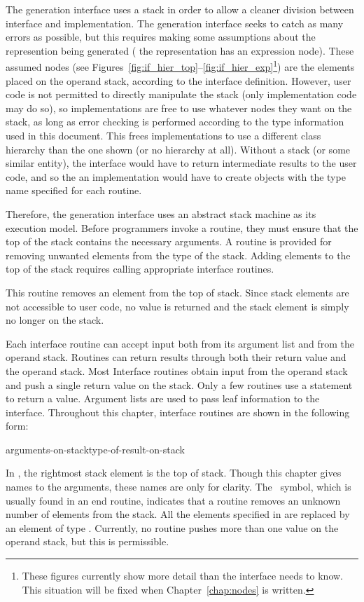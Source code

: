 The generation interface uses a stack in order to allow a cleaner
division between interface and implementation.  The generation
interface seeks to catch as many errors as possible, but this requires
making some assumptions about the represention being generated (\eg
the representation has an expression node).  These assumed nodes (see
Figures~\ref{fig:if_hier_top}--\ref{fig:if_hier_exp}\footnote{These figures
currently show more detail than the interface needs to know.  This
situation will be fixed when Chapter~\ref{chap:nodes} is written.})
are the elements placed on the operand stack, according to the
interface definition.  However, user code is not permitted to directly
manipulate the stack (only implementation code may do so), so
implementations are free to use whatever nodes they want on the stack,
as long as error checking is performed according to the type
information used in this document.  This frees implementations to use
a different class hierarchy than the one shown (or no hierarchy at
all).  Without a stack (or some similar entity), the interface would
have to return intermediate results to the user code, and so the an
implementation would have to create objects with the type name
specified for each routine.

Therefore, the generation interface uses an abstract stack machine as
its execution model.  Before programmers invoke a routine, they must
ensure that the top of the stack contains the necessary arguments.
A  routine is provided for removing unwanted elements from
the type of the stack.  Adding elements to the top of the stack
requires calling appropriate interface routines.
\begin{functionality}
This routine removes an element from the top of stack.  Since stack
elements are not accessible to user code, no value is returned and the
stack element is simply no longer on the stack.
\end{functionality}


Each interface routine can accept input both from its argument list
and from the operand stack.  Routines can return results through both
their return value and the operand stack.  Most Interface routines
obtain input from the operand stack and push a single return value on
the stack.  Only a few routines use a  statement to return
a value.  Argument lists are used to pass leaf information to the
interface.  Throughout this chapter, interface routines are shown in
the following form:
\begin{center}
	{arguments-on-stack}{type-of-result-on-stack}
\end{center}
In , the rightmost stack element is the top
of stack.  Though this chapter gives names to the arguments, these
names are only for clarity.  The \manyPops\ symbol, which is usually
found in an end routine, indicates that a routine removes an unknown
number of elements from the stack.  All the elements specified in
 are replaced by an element of type
.  Currently, no routine pushes more
than one value on the operand stack, but this is permissible.

